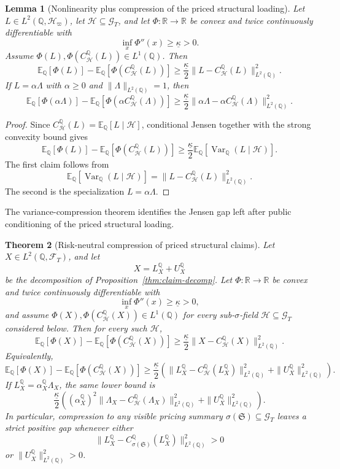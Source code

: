 \documentclass[11pt,a4paper]{amsart}
\theoremstyle{plain}
\newtheorem{theorem}{Theorem}[section]
\newtheorem{lemma}[theorem]{Lemma}
\theoremstyle{definition}
\theoremstyle{remark}
\DeclareMathOperator{\Var}{Var}
\newcommand{\R}{\mathbb{R}}
\newcommand{\QQ}{\mathbb{Q}}
\newcommand{\EE}{\mathbb{E}}
\newcommand{\cF}{\mathcal{F}}
\newcommand{\cG}{\mathcal{G}}
\newcommand{\cH}{\mathcal{H}}
\begin{document}
\begin{lemma}[Nonlinearity plus compression of the priced structural loading]\label{lem:nonlinear-gap}
Let \(L\in L^2(\QQ,\cH_\varpi)\), let \(\cH\subseteq \cG_T\), and let \(\Phi\colon\R\to\R\) be
convex and twice continuously differentiable with
\[
        \inf_x \Phi''(x)\ge \underline\kappa>0.
\]
Assume \(\Phi(L),\Phi(C_{\cH}^\QQ(L))\in L^1(\QQ)\).  Then
\[
        \EE_\QQ[\Phi(L)]-\EE_\QQ[\Phi(C_{\cH}^\QQ(L))]
        \ge
        \frac{\underline\kappa}{2}
        \|L-C_{\cH}^\QQ(L)\|_{L^2(\QQ)}^2.
\]
If \(L=\alpha\Lambda\) with \(\alpha\ge0\) and \(\|\Lambda\|_{L^2(\QQ)}=1\), then
\[
        \EE_\QQ[\Phi(\alpha\Lambda)]-\EE_\QQ[\Phi(\alpha C_{\cH}^\QQ(\Lambda))]
        \ge
        \frac{\underline\kappa}{2}
        \|\alpha\Lambda-\alpha C_{\cH}^\QQ(\Lambda)\|_{L^2(\QQ)}^2.
\]
\end{lemma}

\begin{proof}
Since \(C_{\cH}^\QQ(L)=\EE_\QQ[L\mid \cH]\), conditional Jensen together with the strong convexity
bound gives
\[
        \EE_\QQ[\Phi(L)]-\EE_\QQ[\Phi(C_{\cH}^\QQ(L))]
        \ge
        \frac{\underline\kappa}{2}\EE_\QQ[\Var_\QQ(L\mid \cH)].
\]
The first claim follows from
\[
        \EE_\QQ[\Var_\QQ(L\mid \cH)]
        =
        \|L-C_{\cH}^\QQ(L)\|_{L^2(\QQ)}^2.
\]
The second is the specialization \(L=\alpha\Lambda\).
\end{proof}

The variance-compression theorem identifies the Jensen gap left after public conditioning of the
priced structural loading.

\begin{theorem}[Risk-neutral compression of priced structural claims]\label{thm:q-compression}
Let \(X\in L^2(\QQ,\cF_T)\), and let
\[
        X=L_X^\QQ+U_X^\QQ
\]
be the decomposition of Proposition~\ref{thm:claim-decomp}.  Let \(\Phi\colon\R\to\R\) be convex and
twice continuously differentiable with
\[
        \inf_x \Phi''(x)\ge \underline\kappa>0,
\]
and assume \(\Phi(X),\Phi(C_{\cH}^\QQ(X))\in L^1(\QQ)\) for every sub-\(\sigma\)-field
\(\cH\subseteq \cG_T\) considered below.  Then for every such \(\cH\),
\[
        \EE_\QQ[\Phi(X)]
        -
        \EE_\QQ[\Phi(C_{\cH}^\QQ(X))]
        \ge
        \frac{\underline\kappa}{2}
        \|X-C_{\cH}^\QQ(X)\|_{L^2(\QQ)}^2.
\]
Equivalently,
\[
        \EE_\QQ[\Phi(X)]
        -
        \EE_\QQ[\Phi(C_{\cH}^\QQ(X))]
        \ge
        \frac{\underline\kappa}{2}
        \left(
        \|L_X^\QQ-C_{\cH}^\QQ(L_X^\QQ)\|_{L^2(\QQ)}^2
        +
        \|U_X^\QQ\|_{L^2(\QQ)}^2
        \right).
\]
If \(L_X^\QQ=\alpha_X^\QQ\Lambda_X\), the same lower bound is
\[
        \frac{\underline\kappa}{2}
        \left(
        (\alpha_X^\QQ)^2
        \|\Lambda_X-C_{\cH}^\QQ(\Lambda_X)\|_{L^2(\QQ)}^2
        +
        \|U_X^\QQ\|_{L^2(\QQ)}^2
        \right).
\]
In particular, compression to any visible pricing summary
\(\sigma(\mathfrak S)\subseteq \cG_T\) leaves a strict positive gap whenever either
\[
        \|L_X^\QQ-C_{\sigma(\mathfrak S)}^\QQ(L_X^\QQ)\|_{L^2(\QQ)}^2>0
\]
or \(\|U_X^\QQ\|_{L^2(\QQ)}^2>0\).
\end{theorem}
\end{document}
